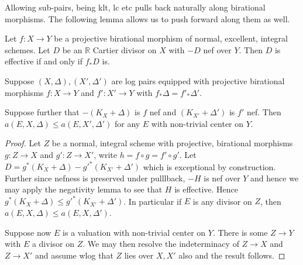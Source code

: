 \documentclass[a4paper,12pt]{book}
\begin{document}
Allowing sub-pairs, being klt, lc etc pulls back naturally along birational morphisms. The following lemma allows us to push forward along them as well.

\begin{lemma}\cite[Lemma 2.14]{bhatt2020}
	Let $f:X \to Y$ be a projective birational morphism of normal, excellent, integral schemes. Let $D$ be an $\mathbb{R}$ Cartier divisor on $X$ with $-D$ nef over $Y$. Then $D$ is effective if and only if $f_{*}D$ is.
\end{lemma}

%

\begin{lemma}
	Suppose $(X,\Delta),(X',\Delta')$ are log pairs equipped with projective birational morphisms $f:X \to Y$ and $f':X'\to Y$ with $f_{*}\Delta=f'_{*}\Delta'$.
	
	Suppose further that $-(K_{X}+\Delta)$ is $f$ nef and $(K_{X'}+\Delta')$ is $f'$ nef. Then $a(E,X,\Delta) \leq a(E,X',\Delta')$ for any $E$ with non-trivial center on $Y$.
\end{lemma}
\begin{proof}
	Let $Z$ be a normal, integral scheme with projective, birational morphisms $g:Z \to X$ and $g':Z \to X'$, write $h=f \circ g=f' \circ g'$. Let $D= g^{*}(K_{X}+\Delta)-g'^{*}(K_{X'}+\Delta')$ which is exceptional by construction. Further since nefness is preserved under pulllback, $-H$ is nef over $Y$ and hence we may apply the negativity lemma to see that $H$ is effective. Hence $g^{*}(K_{X}+\Delta) \leq g'^{*}(K_{X'}+\Delta')$. In particular if $E$ is any divisor on $Z$, then $a(E,X,\Delta) \leq a(E,X,\Delta')$.
	
	Suppose now $E$ is a valuation with non-trivial center on $Y$. There is some $Z \to Y$ with $E$ a divisor on $Z$. We may then resolve the indeterminacy of $Z \to X$ and $Z \to X'$ and assume wlog that $Z$ lies over $X,X'$ also and the result follows.
\end{proof}
\end{document}
